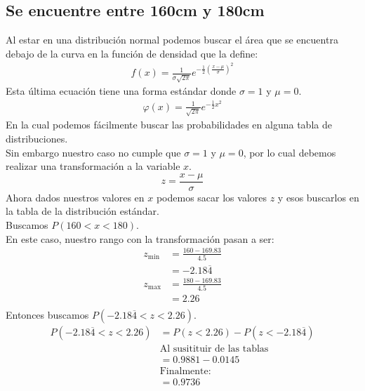 \documentclass[12pt]{article}
\begin{document}
\subsection{Se encuentre entre 160cm y 180cm}
Al estar en una distribución normal podemos buscar el área que se encuentra debajo de la curva en la función de densidad que la define:
\begin{equation}
\begin{split}
f(x)=\frac{1}{\sigma\sqrt{2\pi}}e^{-\frac{1}{2}(\frac{x-\mu}{\sigma})^2}
\end{split}
\end{equation}
Esta última ecuación tiene una forma estándar donde $\sigma = 1$ y $\mu=0$.
\begin{equation}
\begin{split}
\varphi(x)=\frac{1}{\sqrt{2\pi}}e^{-\frac{1}{2}x^2}
\end{split}
\end{equation}
En la cual podemos fácilmente buscar las probabilidades en alguna tabla de distribuciones.\\
Sin embargo nuestro caso no cumple que $\sigma = 1$ y $\mu=0$, por lo cual debemos realizar una transformación a la variable $x$.
\begin{equation}
	z = \frac{x - \mu}{\sigma}
\end{equation}
Ahora dados nuestros valores en $x$ podemos sacar los valores $z$ y esos buscarlos en la tabla de la distribución estándar.\\
Buscamos $P(160 < x < 180)$.\\
En este caso, nuestro rango con la transformación pasan a ser:
\begin{equation}
\begin{split}
z_{\text{min}} &= \frac{160 - 169.83}{4.5}\\
&= -2.18\overline{4}\\
z_{\text{max}} &= \frac{180 - 169.83}{4.5}\\
&= 2.26\\
\end{split}
\end{equation}
Entonces buscamos $P(-2.18\overline{4} < z < 2.26)$.\\
\begin{equation}
	\begin{split}
	P(-2.18\overline{4} < z < 2.26)&=P(z< 2.26)-P(z < -2.18\overline{4})\\
	&\text{Al susitituir de las tablas}\\
	&=0.9881-0.0145\\
	&\text{Finalmente:}\\
	&=0.9736\\
	\end{split}
\end{equation}
\end{document}
